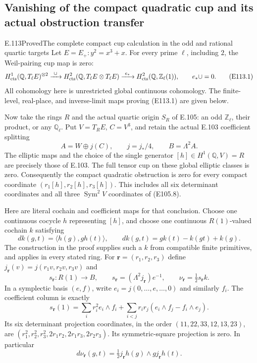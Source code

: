 \subsection*{Vanishing of the compact quadratic cup and its actual obstruction transfer}
\begin{statement}{E.113}{Proved}{The complete compact cup calculation in the odd and rational quartic targets}
Let $E=E_+:y^2=x^3+x$.  For every prime $\ell$, including $2$,
the Weil-pairing cup map is zero:
\[
 H^1_{\rm cts}(\mathbb Q,T_\ell E)^{\otimes2}
 \xrightarrow{\ \cup\ }
 H^2_{\rm cts}(\mathbb Q,T_\ell E\otimes T_\ell E)
 \xrightarrow{\ e_*\ }
 H^2_{\rm cts}(\mathbb Q,\mathbb Z_\ell(1)),
 \qquad e_*\cup=0.
 \tag{E113.1}
\]
All cohomology here is unrestricted global continuous cohomology.
The finite-level, real-place, and inverse-limit maps proving
(E113.1) are given below.

Now take the rings $R$ and the actual quartic origin $S_R$ of
E.105: an odd $\mathbb Z_\ell$, their product, or any
$\mathbb Q_\ell$.  Put $V=T_RE$, $C=V^3$, and retain the
actual E.103 coefficient splitting
\[
 A=W\oplus j(C),\qquad j=j_*/4,
 \qquad B=\Lambda^2 A.
 \tag{E113.2}
\]
The elliptic maps and the choice of the single generator
$[h]\in H^1(\mathbb Q,V)=R$ are precisely those of E.103.
The full tensor cup on these global elliptic classes is zero.
Consequently the compact quadratic obstruction is zero for
every compact coordinate $(r_1[h],r_2[h],r_3[h])$.
This includes all six determinant coordinates and all three
$\operatorname{Sym}^2V$ coordinates of (E105.8).

Here are literal cochain and coefficient maps for that conclusion.
Choose one continuous cocycle $h$ representing $[h]$, and choose
one continuous $R(1)$-valued cochain $k$ satisfying
\[
 dk(g,t)=\langle h(g),g h(t)\rangle,
 \qquad dk(g,t)=gk(t)-k(gt)+k(g).
 \tag{E113.3}
\]
The construction in the proof supplies such a $k$ from compatible
finite primitives, and applies in every stated ring.
For $\mathbf r=(r_1,r_2,r_3)$ define
$j_{\mathbf r}(v)=j(r_1v,r_2v,r_3v)$ and
\[
 s_{\mathbf r}:R(1)\longrightarrow B,
 \qquad s_{\mathbf r}=(\Lambda^2 j_{\mathbf r})e^{-1},
 \qquad \nu_{\mathbf r}=\tfrac12s_{\mathbf r}k.
 \tag{E113.4}
\]
In a symplectic basis $(e,f)$, write
$e_i=j(0,\ldots,e,\ldots,0)$ and similarly $f_i$.
The coefficient column is exactly
\[
 s_{\mathbf r}(1)=
 \sum_i r_i^2 e_i\wedge f_i+
 \sum_{i<j}r_ir_j(e_i\wedge f_j-f_i\wedge e_j).
 \tag{E113.5}
\]
Its six determinant projection coordinates, in the order
$(11,22,33,12,13,23)$, are
$(r_1^2,r_2^2,r_3^2,2r_1r_2,2r_1r_3,2r_2r_3)$.
Its symmetric-square projection is zero.  In particular
\[
 d\nu_{\mathbf r}(g,t)
       =\tfrac12j_{\mathbf r}h(g)\wedge
                         g j_{\mathbf r}h(t).
 \tag{E113.6}
\]


\end{statement}
